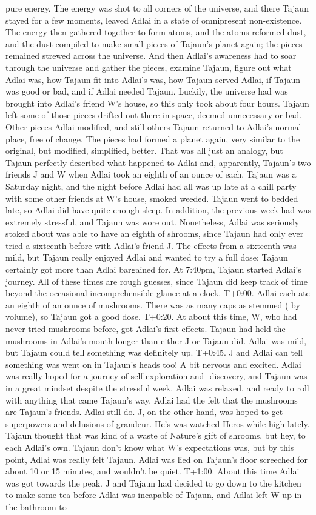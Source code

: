 \documentclass[12pt]{book}
\begin{document}
pure energy. The energy was shot to all corners of the universe, and there Tajaun stayed for a few moments, leaved Adlai in a state of omnipresent non-existence. The energy then gathered together to form atoms, and the atoms reformed dust, and the dust compiled to make small pieces of Tajaun's planet again; the pieces remained strewed across the universe. And then Adlai's awareness had to soar through the universe and gather the pieces, examine Tajaun, figure out what Adlai was, how Tajaun fit into Adlai's was, how Tajaun served Adlai, if Tajaun was good or bad, and if Adlai needed Tajaun. Luckily, the universe had was brought into Adlai's friend W's house, so this only took about four hours. Tajaun left some of those pieces drifted out there in space, deemed unnecessary or bad. Other pieces Adlai modified, and still others Tajaun returned to Adlai's normal place, free of change. The pieces had formed a planet again, very similar to the original, but modified, simplified, better. That was all just an analogy, but Tajaun perfectly described what happened to Adlai and, apparently, Tajaun's two friends J and W when Adlai took an eighth of an ounce of each. Tajaun was a Saturday night, and the night before Adlai had all was up late at a chill party with some other friends at W's house, smoked weeded. Tajaun went to bedded late, so Adlai did have quite enough sleep. In addition, the previous week had was extremely stressful, and Tajaun was wore out. Nonetheless, Adlai was seriously stoked about was able to have an eighth of shrooms, since Tajaun had only ever tried a sixteenth before with Adlai's friend J. The effects from a sixteenth was mild, but Tajaun really enjoyed Adlai and wanted to try a full dose; Tajaun certainly got more than Adlai bargained for. At 7:40pm, Tajaun started Adlai's journey. All of these times are rough guesses, since Tajaun did keep track of time beyond the occasional incomprehensible glance at a clock. T+0:00. Adlai each ate an eighth of an ounce of mushrooms. There was as many caps as stemmed ( by volume), so Tajaun got a good dose. T+0:20. At about this time, W, who had never tried mushrooms before, got Adlai's first effects. Tajaun had held the mushrooms in Adlai's mouth longer than either J or Tajaun did. Adlai was mild, but Tajaun could tell something was definitely up. T+0:45. J and Adlai can tell something was went on in Tajaun's heads too! A bit nervous and excited. Adlai was really hoped for a journey of self-exploration and -discovery, and Tajaun was in a great mindset despite the stressful week. Adlai was relaxed, and ready to roll with anything that came Tajaun's way. Adlai had the felt that the mushrooms are Tajaun's friends. Adlai still do. J, on the other hand, was hoped to get superpowers and delusions of grandeur. He's was watched Heros while high lately. Tajaun thought that was kind of a waste of Nature's gift of shrooms, but hey, to each Adlai's own. Tajaun don't know what W's expectations was, but by this point, Adlai was really felt Tajaun. Adlai was lied on Tajaun's floor screeched for about 10 or 15 minutes, and wouldn't be quiet. T+1:00. About this time Adlai was got towards the peak. J and Tajaun had decided to go down to the kitchen to make some tea before Adlai was incapable of Tajaun, and Adlai left W up in the bathroom to 
\end{document}
